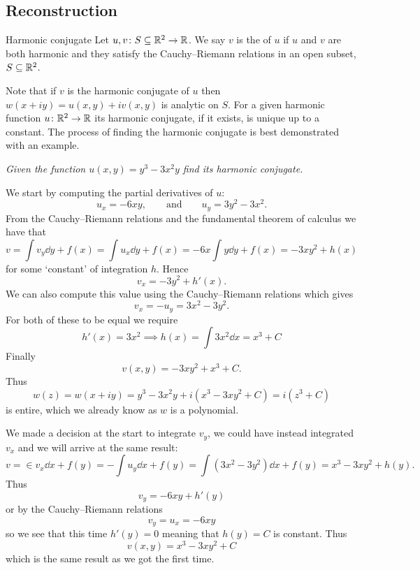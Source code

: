 \documentclass{article}
\begin{document}
    \subsection{Reconstruction}
    \begin{definition}{Harmonic conjugate}{}
        Let \(u, v\colon S\subseteq\mathbb{R}^2\to\mathbb{R}\).
        We say \(v\) is the  of \(u\) if \(u\) and \(v\) are both harmonic and they satisfy the Cauchy--Riemann relations in an open subset, \(S\subseteq \mathbb{R}^2\).
    \end{definition}
    Note that if \(v\) is the harmonic conjugate of \(u\) then \(w(x + iy) = u(x, y) + iv(x, y)\) is analytic on \(S\).
    For a given harmonic function \(u\colon\mathbb{R}^2\to\mathbb{R}\) its harmonic conjugate, if it exists, is unique up to a constant.
    The process of finding the harmonic conjugate is best demonstrated with an example.
    \begin{example}
        \textit{Given the function \(u(x, y) = y^3 - 3x^2y\) find its harmonic conjugate.}
        
        We start by computing the partial derivatives of \(u\):
        \[u_x = -6xy, \qquad\text{and}\qquad u_y = 3y^2 - 3x^2.\]
        From the Cauchy--Riemann relations and the fundamental theorem of calculus we have that
        \[v = \int v_y \dd{y} + f(x) = \int u_x \dd{y} + f(x) = -6x\int y \dd{y} + f(x) = -3xy^2 + h(x)\]
        for some `constant' of integration \(h\).
        Hence
        \[v_x = -3y^2 + h'(x).\]
        We can also compute this value using the Cauchy--Riemann relations which gives
        \[v_x = -u_y = 3x^2 - 3y^2.\]
        For both of these to be equal we require
        \[h'(x) = 3x^2 \implies h(x) = \int 3x^2 \dd{x} = x^3 + C\]
        Finally
        \[v(x, y) = -3xy^2 + x^3 + C.\]
        Thus
        \[w(z) = w(x + iy) = y^3 - 3x^2y + i(x^3 - 3xy^2 + C) = i(z^3 + C)\]
        is entire, which we already know as \(w\) is a polynomial.
        
        We made a decision at the start to integrate \(v_y\), we could have instead integrated \(v_x\) and we will arrive at the same result:
        \[v = \in v_x \dd{x} + f(y) = -\int u_y \dd{x} + f(y) = \int (3x^2 - 3y^2) \dd{x} + f(y) = x^3 - 3xy^2 + h(y).\]
        Thus
        \[v_y = -6xy + h'(y)\]
        or by the Cauchy--Riemann relations
        \[v_y = u_x = -6xy\]
        so we see that this time \(h'(y) = 0\) meaning that \(h(y) = C\) is constant.
        Thus
        \[v(x, y) = x^3 - 3xy^2 + C\]
        which is the same result as we got the first time.
    \end{example}
    
\end{document}

